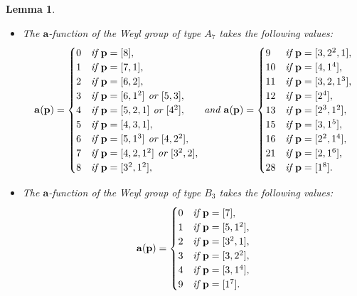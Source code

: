 \documentclass[reqno,12pt]{amsart}
\numberwithin{equation}{section}
\theoremstyle{plain}
\newtheorem{Lem}[Thm]{Lemma}
\theoremstyle{definition}
\newcommand{\aff}{ \mathbf{a} }
\begin{document}
\begin{Lem}
\begin{itemize}
 \item [(6)]  The  $\aff$-function of the Weyl group of type $ A_7$  takes the following values:
$$\aff({\bf p})=\begin{cases}
	0 &\emph{if }{\bf p}=[8],\\
	1 &\emph{if }{\bf p}=[7,1],\\
 2 &\emph{if }{\bf p}=[6,2],\\
 3 &\emph{if }{\bf p}=[6,1^2] \emph{~or~} [5,3],\\
 4 &\emph{if }{\bf p}=[5,2,1] \emph{~or~} [4^2],\\
 5 &\emph{if }{\bf p}=[4,3,1],\\
 6 &\emph{if }{\bf p}=[5,1^3] \emph{~or~} [4,2^2], \\
 7 &\emph{if }{\bf p}=[4,2,1^2] \emph{~or~} [3^2,2], \\
8 &\emph{if }{\bf p}=[3^2,1^2],\\
	\end{cases}
  \emph{~and~} \aff(\bf p)=\begin{cases}
9 &\emph{if }{\bf p}=[3,2^2,1],\\
10 &\emph{if }{\bf p}=[4,1^4],\\
11 &\emph{if }{\bf p}=[3,2,1^3],\\
12 &\emph{if }{\bf p}=[2^4],\\
13 &\emph{if }{\bf p}=[2^3,1^2],\\
15 &\emph{if }{\bf p}=[3,1^5],\\
16 &\emph{if }{\bf p}=[2^2,1^4],\\
21 &\emph{if }{\bf p}=[2,1^6],\\
28 &\emph{if }{\bf p}=[1^8].\\
	\end{cases}
 $$

 
\item [(7)] The  $\aff$-function of the Weyl group of type $B_3 $ takes the following values:
    $$\aff({\bf p})=\begin{cases}
	0 &\emph{if }{\bf p}=[7],\\
	1 &\emph{if }{\bf p}=[5,1^2],\\
 2 &\emph{if }{\bf p}=[3^2,1],\\
 3 &\emph{if }{\bf p}=[3,2^2],\\
 4 &\emph{if }{\bf p}=[3,1^4],\\
9 &\emph{if }{\bf p}=[1^7].\\
	\end{cases}
 $$


\end{itemize}
\end{Lem}
\end{document}
